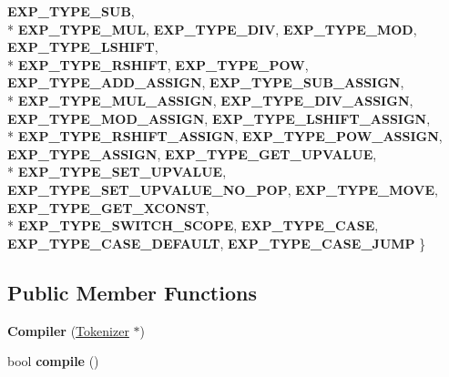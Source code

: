\begin{DoxyCompactItemize}
{\bfseries E\+X\+P\+\_\+\+T\+Y\+P\+E\+\_\+\+S\+UB}, 
\\*
{\bfseries E\+X\+P\+\_\+\+T\+Y\+P\+E\+\_\+\+M\+UL}, 
{\bfseries E\+X\+P\+\_\+\+T\+Y\+P\+E\+\_\+\+D\+IV}, 
{\bfseries E\+X\+P\+\_\+\+T\+Y\+P\+E\+\_\+\+M\+OD}, 
{\bfseries E\+X\+P\+\_\+\+T\+Y\+P\+E\+\_\+\+L\+S\+H\+I\+FT}, 
\\*
{\bfseries E\+X\+P\+\_\+\+T\+Y\+P\+E\+\_\+\+R\+S\+H\+I\+FT}, 
{\bfseries E\+X\+P\+\_\+\+T\+Y\+P\+E\+\_\+\+P\+OW}, 
{\bfseries E\+X\+P\+\_\+\+T\+Y\+P\+E\+\_\+\+A\+D\+D\+\_\+\+A\+S\+S\+I\+GN}, 
{\bfseries E\+X\+P\+\_\+\+T\+Y\+P\+E\+\_\+\+S\+U\+B\+\_\+\+A\+S\+S\+I\+GN}, 
\\*
{\bfseries E\+X\+P\+\_\+\+T\+Y\+P\+E\+\_\+\+M\+U\+L\+\_\+\+A\+S\+S\+I\+GN}, 
{\bfseries E\+X\+P\+\_\+\+T\+Y\+P\+E\+\_\+\+D\+I\+V\+\_\+\+A\+S\+S\+I\+GN}, 
{\bfseries E\+X\+P\+\_\+\+T\+Y\+P\+E\+\_\+\+M\+O\+D\+\_\+\+A\+S\+S\+I\+GN}, 
{\bfseries E\+X\+P\+\_\+\+T\+Y\+P\+E\+\_\+\+L\+S\+H\+I\+F\+T\+\_\+\+A\+S\+S\+I\+GN}, 
\\*
{\bfseries E\+X\+P\+\_\+\+T\+Y\+P\+E\+\_\+\+R\+S\+H\+I\+F\+T\+\_\+\+A\+S\+S\+I\+GN}, 
{\bfseries E\+X\+P\+\_\+\+T\+Y\+P\+E\+\_\+\+P\+O\+W\+\_\+\+A\+S\+S\+I\+GN}, 
{\bfseries E\+X\+P\+\_\+\+T\+Y\+P\+E\+\_\+\+A\+S\+S\+I\+GN}, 
{\bfseries E\+X\+P\+\_\+\+T\+Y\+P\+E\+\_\+\+G\+E\+T\+\_\+\+U\+P\+V\+A\+L\+UE}, 
\\*
{\bfseries E\+X\+P\+\_\+\+T\+Y\+P\+E\+\_\+\+S\+E\+T\+\_\+\+U\+P\+V\+A\+L\+UE}, 
{\bfseries E\+X\+P\+\_\+\+T\+Y\+P\+E\+\_\+\+S\+E\+T\+\_\+\+U\+P\+V\+A\+L\+U\+E\+\_\+\+N\+O\+\_\+\+P\+OP}, 
{\bfseries E\+X\+P\+\_\+\+T\+Y\+P\+E\+\_\+\+M\+O\+VE}, 
{\bfseries E\+X\+P\+\_\+\+T\+Y\+P\+E\+\_\+\+G\+E\+T\+\_\+\+X\+C\+O\+N\+ST}, 
\\*
{\bfseries E\+X\+P\+\_\+\+T\+Y\+P\+E\+\_\+\+S\+W\+I\+T\+C\+H\+\_\+\+S\+C\+O\+PE}, 
{\bfseries E\+X\+P\+\_\+\+T\+Y\+P\+E\+\_\+\+C\+A\+SE}, 
{\bfseries E\+X\+P\+\_\+\+T\+Y\+P\+E\+\_\+\+C\+A\+S\+E\+\_\+\+D\+E\+F\+A\+U\+LT}, 
{\bfseries E\+X\+P\+\_\+\+T\+Y\+P\+E\+\_\+\+C\+A\+S\+E\+\_\+\+J\+U\+MP}
 \}\hypertarget{class_object_script_1_1_o_s_1_1_core_1_1_compiler_a2848b237f4518804c91cd703ff816c48}{}\label{class_object_script_1_1_o_s_1_1_core_1_1_compiler_a2848b237f4518804c91cd703ff816c48}

\end{DoxyCompactItemize}
\subsection*{Public Member Functions}
\begin{DoxyCompactItemize}
\item 
{\bfseries Compiler} (\hyperlink{class_object_script_1_1_o_s_1_1_core_1_1_tokenizer}{Tokenizer} $\ast$)\hypertarget{class_object_script_1_1_o_s_1_1_core_1_1_compiler_a9ad37541ec7b4f5b07d2279d0bd079d1}{}\label{class_object_script_1_1_o_s_1_1_core_1_1_compiler_a9ad37541ec7b4f5b07d2279d0bd079d1}

\item 
bool {\bfseries compile} ()\hypertarget{class_object_script_1_1_o_s_1_1_core_1_1_compiler_ae02f68e11b18330b0172355a44138e8d}{}\label{class_object_script_1_1_o_s_1_1_core_1_1_compiler_ae02f68e11b18330b0172355a44138e8d}

\end{DoxyCompactItemize}
